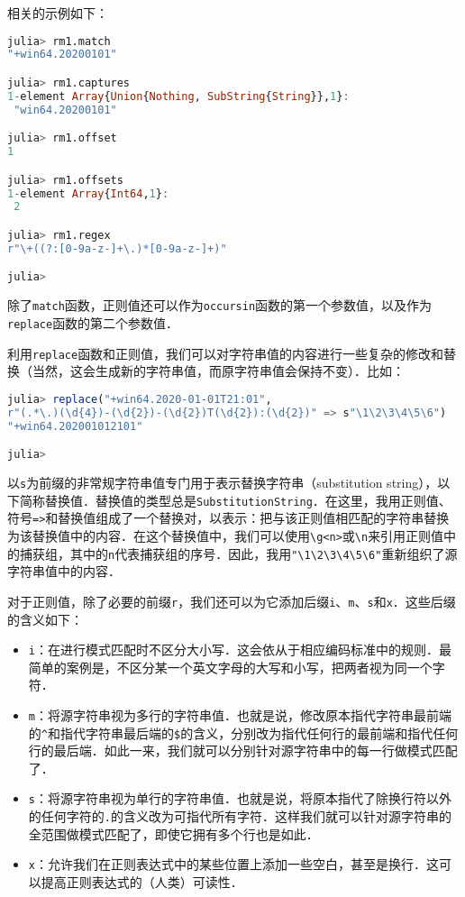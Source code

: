 相关的示例如下：
\begin{lstlisting}[language=julia]
julia> rm1.match
"+win64.20200101"

julia> rm1.captures
1-element Array{Union{Nothing, SubString{String}},1}:
 "win64.20200101"

julia> rm1.offset
1

julia> rm1.offsets
1-element Array{Int64,1}:
 2

julia> rm1.regex
r"\+((?:[0-9a-z-]+\.)*[0-9a-z-]+)"

julia> 
\end{lstlisting}

除了\verb|match|函数，正则值还可以作为\verb|occursin|函数的第一个参数值，以及作为\verb|replace|函数的第二个参数值．

利用\verb|replace|函数和正则值，我们可以对字符串值的内容进行一些复杂的修改和替换（当然，这会生成新的字符串值，而原字符串值会保持不变）．比如：
\begin{lstlisting}[language=julia]
julia> replace("+win64.2020-01-01T21:01", 
r"(.*\.)(\d{4})-(\d{2})-(\d{2})T(\d{2}):(\d{2})" => s"\1\2\3\4\5\6")
"+win64.202001012101"

julia> 
\end{lstlisting}

以\verb|s|为前缀的非常规字符串值专门用于表示替换字符串（substitution string），以下简称替换值．替换值的类型总是\verb|SubstitutionString|．在这里，我用正则值、符号\verb|=>|和替换值组成了一个替换对，以表示：把与该正则值相匹配的字符串替换为该替换值中的内容．在这个替换值中，我们可以使用\verb|\g<n>|或\verb|\n|来引用正则值中的捕获组，其中的\verb|n|代表捕获组的序号．因此，我用\verb|"\1\2\3\4\5\6"|重新组织了源字符串值中的内容．

对于正则值，除了必要的前缀\verb|r|，我们还可以为它添加后缀\verb|i|、\verb|m|、\verb|s|和\verb|x|．这些后缀的含义如下：
\begin{itemize}
\item \verb|i|：在进行模式匹配时不区分大小写．这会依从于相应编码标准中的规则．最简单的案例是，不区分某一个英文字母的大写和小写，把两者视为同一个字符．
\item  \verb|m|：将源字符串视为多行的字符串值．也就是说，修改原本指代字符串最前端的\verb|^|和指代字符串最后端的\verb|$|的含义，分别改为指代任何行的最前端和指代任何行的最后端．如此一来，我们就可以分别针对源字符串中的每一行做模式匹配了．
\item  \verb|s|：将源字符串视为单行的字符串值．也就是说，将原本指代了除换行符以外的任何字符的\verb|.|的含义改为可指代所有字符．这样我们就可以针对源字符串的全范围做模式匹配了，即使它拥有多个行也是如此．
\item  \verb|x|：允许我们在正则表达式中的某些位置上添加一些空白，甚至是换行．这可以提高正则表达式的（人类）可读性．
\end{itemize}

